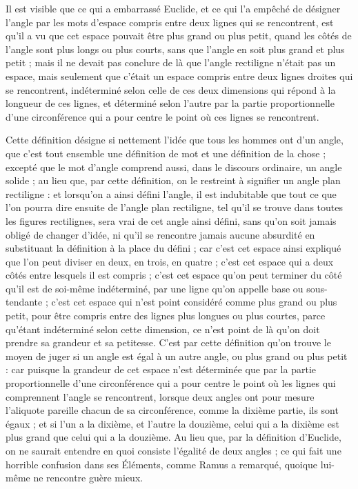 Il est visible que ce qui a embarrassé Euclide, et ce qui l'a empêché de désigner l'angle par les mots d'espace compris entre deux lignes qui se rencontrent, est qu'il a vu que cet espace pouvait être plus grand ou plus petit, quand les côtés de l'angle sont plus longs ou plus courts, sans que l'angle en soit plus grand et plus petit ; mais il ne devait pas conclure de là que l'angle rectiligne n'était pas un espace, mais seulement que c'était un espace compris entre deux lignes droites qui se rencontrent, indéterminé selon celle de ces deux dimensions qui répond à la longueur de ces lignes, et déterminé selon l'autre par la partie proportionnelle d'une circonférence qui a pour centre le point où ces lignes se rencontrent.

Cette définition désigne si nettement l'idée que tous les hommes ont d'un angle, que c'est tout ensemble une définition de mot et une définition de la chose ; excepté que le mot d'angle comprend aussi, dans le discours ordinaire, un angle solide ; au lieu que, par cette définition, on le restreint à signifier un angle plan rectiligne : et lorsqu'on a ainsi défini l'angle, il est indubitable que tout ce que l'on pourra dire ensuite de l'angle plan rectiligne, tel qu'il se trouve dans toutes les figures rectilignes, sera vrai de cet angle ainsi défini, sans qu'on soit jamais obligé de changer d'idée, ni qu'il se rencontre jamais aucune absurdité en substituant la définition à la place du défini ; car c'est cet espace ainsi expliqué que l'on peut diviser en deux, en trois, en quatre ; c'est cet espace qui a deux côtés entre lesquels il est compris ; c'est cet espace qu'on peut terminer du côté qu'il est de soi-même indéterminé, par une ligne qu'on appelle base ou sous-tendante ; c'est cet espace qui n'est point considéré comme plus grand ou plus petit, pour être compris entre des lignes plus longues ou plus courtes, parce qu'étant indéterminé selon cette dimension, ce n'est point de là qu'on doit prendre sa grandeur et sa petitesse. C'est par cette définition qu'on trouve le moyen de juger si un angle est égal à un autre angle, ou plus grand ou plus petit : car puisque la grandeur de cet espace n'est déterminée que par la partie proportionnelle d'une circonférence qui a pour centre le point où les lignes qui comprennent l'angle se rencontrent, lorsque deux angles ont pour mesure l'aliquote pareille chacun de sa circonférence, comme la dixième partie, ils sont égaux ; et si l'un a la dixième, et l'autre la douzième, celui qui a la dixième est plus grand que celui qui a la douzième. Au lieu que, par la définition d'Euclide, on ne saurait entendre en quoi consiste l'égalité de deux angles ; ce qui fait une horrible confusion dans ses Éléments, comme Ramus a remarqué, quoique lui-même ne rencontre guère mieux.

